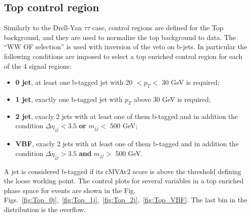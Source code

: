 \subsection*{Top control region}
Similarly to the Drell-Yan $\tau\tau$ case, control regions are defined for the Top
background, and they are used to normalize the top background to data.
The ``WW OF selection'' is used with inversion of the veto on b-jets. In
particular the following conditions are imposed to select a top enriched
control region for each of the 4 signal regions:
\begin{itemize}
\item {\bf 0 jet}, at least one b-tagged jet with 20 $< p_T <$ 30 GeV is required;
\item {\bf 1 jet}, exactly one b-tagged jet with $p_T$ above 30 GeV is required;
\item {\bf 2 jet}, exacly 2 jets with at least one of them b-tagged and in addition the condition $\Delta \eta_{jj} < 3.5$ {\bf or} $m_{jj} <$ 500 GeV;
\item {\bf VBF}, exacly 2 jets with at least one of them b-tagged and in addition the condition $\Delta \eta_{jj} > 3.5$ {\bf and} $m_{jj} >$ 500 GeV.
\end{itemize}
A jet is considered b-tagged if its cMVAv2 score is above the threshold
defining the loose working point.
The control plots for several variables in a top enriched phase space for events are shown in the Fig.~ Figs.~\ref{fig:Top_0j},~\ref{fig:Top_1j},~\ref{fig:Top_2j},~\ref{fig:Top_VBF}. The last bin in the distribution is the overflow.
